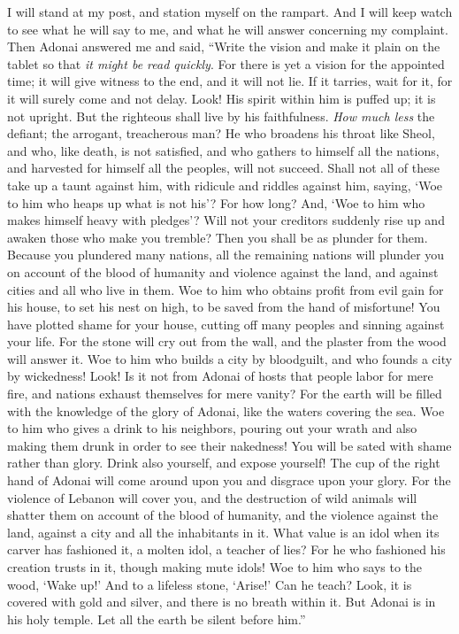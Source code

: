 \begin{biblechapter} %
 I will stand at my post, 
and station myself on the rampart. 
And I will keep watch to see what he will say to me, 
and what he will answer concerning my complaint.
\verse Then Adonai answered me and said, 
“Write the vision and make it plain on the tablet 
so that \textit{it might be read quickly}.
\verse For there is yet a vision for the appointed time; 
it will give witness to the end, and it will not lie. 
If it tarries, wait for it, 
for it will surely come and not delay.
\verse Look! His spirit within him is puffed up; 
it is not upright. 
But the righteous shall live by his faithfulness.
\verse \textit{How much less} the defiant; 
the arrogant, treacherous man? 
He who broadens his throat like Sheol, 
and who, like death, is not satisfied, 
and who gathers to himself all the nations, 
and harvested for himself all the peoples, 
will not succeed.
\verse Shall not all of these take up a taunt against him, 
with ridicule and riddles against him, saying, 
‘Woe to him who heaps up what is not his’? 
For how long? 
And, ‘Woe to him who makes himself heavy with pledges’?
\verse Will not your creditors suddenly rise up 
and awaken those who make you tremble? 
Then you shall be as plunder for them.
\verse Because you plundered many nations, 
all the remaining nations will plunder you 
on account of the blood of humanity 
and violence against the land, 
and against cities and all who live in them.
\verse Woe to him who obtains profit from evil gain for his house, 
to set his nest on high, 
to be saved from the hand of misfortune!
\verse You have plotted shame for your house, 
cutting off many peoples 
and sinning against your life.
\verse For the stone will cry out from the wall, 
and the plaster from the wood will answer it.
\verse Woe to him who builds a city by bloodguilt, 
and who founds a city by wickedness!
\verse Look! Is it not from Adonai of hosts 
that people labor for mere fire, 
and nations exhaust themselves for mere vanity?
\verse For the earth will be filled 
with the knowledge of the glory of Adonai, 
like the waters covering the sea.
\verse Woe to him who gives a drink to his neighbors, 
pouring out your wrath and also making them drunk 
in order to see their nakedness!
\verse You will be sated with shame rather than glory. 
Drink also yourself, and expose yourself! 
The cup of the right hand of Adonai 
will come around upon you 
and disgrace upon your glory.
\verse For the violence of Lebanon will cover you, 
and the destruction of wild animals will shatter them 
on account of the blood of humanity, 
and the violence against the land, 
against a city and all the inhabitants in it.
\verse What value is an idol 
when its carver has fashioned it, 
a molten idol, a teacher of lies? 
For he who fashioned his creation trusts in it, 
though making mute idols!
\verse Woe to him who says to the wood, ‘Wake up!’ 
And to a lifeless stone, ‘Arise!’ 
Can he teach? 
Look, it is covered with gold and silver, 
and there is no breath within it.
\verse But Adonai is in his holy temple. 
Let all the earth be silent before him.”
\end{biblechapter}

